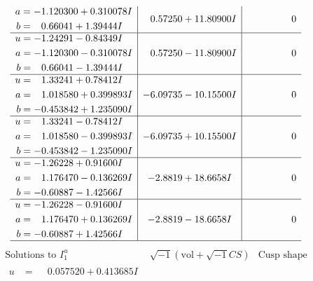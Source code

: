 \documentclass[1p]{elsarticle_modified}
\theoremstyle{definition}
\newcommand{\I}{\sqrt{-1}}
\begin{document}
$$\begin{array}{c|c|c}
\begin{aligned}
a &= -1.120300 + 0.310078 I \\
b &= \phantom{-}0.66041 + 1.39444 I\end{aligned}
 & \phantom{-}0.57250 + 11.80900 I & \phantom{-0.000000 } 0 \\ \hline\begin{aligned}
u &= -1.24291 - 0.84349 I \\
a &= -1.120300 - 0.310078 I \\
b &= \phantom{-}0.66041 - 1.39444 I\end{aligned}
 & \phantom{-}0.57250 - 11.80900 I & \phantom{-0.000000 } 0 \\ \hline\begin{aligned}
u &= \phantom{-}1.33241 + 0.78412 I \\
a &= \phantom{-}1.018580 + 0.399893 I \\
b &= -0.453842 + 1.235090 I\end{aligned}
 & -6.09735 - 10.15500 I & \phantom{-0.000000 } 0 \\ \hline\begin{aligned}
u &= \phantom{-}1.33241 - 0.78412 I \\
a &= \phantom{-}1.018580 - 0.399893 I \\
b &= -0.453842 - 1.235090 I\end{aligned}
 & -6.09735 + 10.15500 I & \phantom{-0.000000 } 0 \\ \hline\begin{aligned}
u &= -1.26228 + 0.91600 I \\
a &= \phantom{-}1.176470 - 0.136269 I \\
b &= -0.60887 - 1.42566 I\end{aligned}
 & -2.8819 + 18.6658 I & \phantom{-0.000000 } 0 \\ \hline\begin{aligned}
u &= -1.26228 - 0.91600 I \\
a &= \phantom{-}1.176470 + 0.136269 I \\
b &= -0.60887 + 1.42566 I\end{aligned}
 & -2.8819 - 18.6658 I & \phantom{-0.000000 } 0\\
 \hline 
 \end{array}$$\newpage$$\begin{array}{c|c|c}  
\text{Solutions to }I^u_{1}& \I (\text{vol} + \sqrt{-1}CS) & \text{Cusp shape}\\
 \hline 
\begin{aligned}
u &= \phantom{-}0.057520 + 0.413685 I \\

\end{aligned}
\end{array}$$
\end{document}
